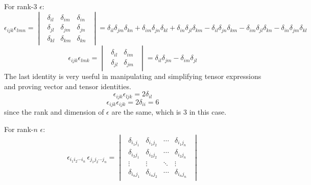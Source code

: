  For rank-3 $\epsilon$:
\begin{equation}
\epsilon_{ijk}\epsilon_{lmn}=\begin{vmatrix}\begin{array}{ccc}
\delta_{il} & \delta_{im} & \delta_{in}\\
\delta_{jl} & \delta_{jm} & \delta_{jn}\\
\delta_{kl} & \delta_{km} & \delta_{kn}
\end{array}\end{vmatrix}=\delta_{il}\delta_{jm}\delta_{kn}+\delta_{im}\delta_{jn}\delta_{kl}+\delta_{in}\delta_{jl}\delta_{km}-\delta_{il}\delta_{jn}\delta_{km}-\delta_{im}\delta_{jl}\delta_{kn}-\delta_{in}\delta_{jm}\delta_{kl}
\end{equation}
\begin{equation}
\epsilon_{ijk}\epsilon_{lmk}=\begin{vmatrix}\begin{array}{cc}
\delta_{il} & \delta_{im}\\
\delta_{jl} & \delta_{jm}
\end{array}\end{vmatrix}=\delta_{il}\delta_{jm}-\delta_{im}\delta_{jl}\label{EqEpsilonDelta}
\end{equation}
The last identity is very useful in manipulating and simplifying tensor
expressions and proving vector and tensor identities.
\begin{equation}
\epsilon_{ijk}\epsilon_{ljk}=2\delta_{il}
\end{equation}
\begin{equation}
\epsilon_{ijk}\epsilon_{ijk}=2\delta_{ii}=6
\end{equation}
since the rank and dimension of $\epsilon$ are the same, which is
3 in this case.

 For rank-$n$ $\epsilon$:
\begin{equation}
\epsilon_{i_{1}i_{2}\cdots i_{n}}\,\epsilon_{j_{1}j_{2}\cdots j_{n}}=\begin{vmatrix}\begin{array}{cccc}
\delta_{i_{1}j_{1}} & \delta_{i_{1}j_{2}} & \cdots & \delta_{i_{1}j_{n}}\\
\delta_{i_{2}j_{1}} & \delta_{i_{2}j_{2}} & \cdots & \delta_{i_{2}j_{n}}\\
\vdots & \vdots & \ddots & \vdots\\
\delta_{i_{n}j_{1}} & \delta_{i_{n}j_{2}} & \cdots & \delta_{i_{n}j_{n}}
\end{array}\end{vmatrix}\label{eqEpsilon2}
\end{equation}


